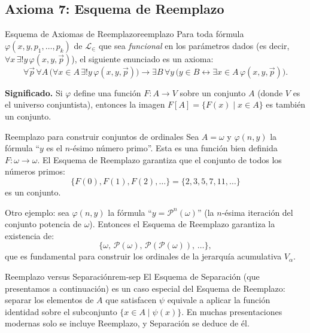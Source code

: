 \subsection{Axioma 7: Esquema de Reemplazo}

\begin{definicion}{Esquema de Axiomas de Reemplazo}{reemplazo}
Para toda fórmula $\varphi(x, y, p_1, \ldots, p_k)$ de $\mathcal{L}_{\in}$ que sea \emph{funcional} en los parámetros dados (es decir, $\forall x\,\exists! y\,\varphi(x,y,\vec{p})$), el siguiente enunciado es un axioma:
\[
  \forall \vec{p}\,\forall A\,\bigl(\forall x \in A\,\exists! y\,\varphi(x,y,\vec{p})\bigr)
  \to \exists B\,\forall y\,\bigl(y \in B \leftrightarrow \exists x \in A\,\varphi(x,y,\vec{p})\bigr).
\]
\end{definicion}

\textbf{Significado.} Si $\varphi$ define una función $F: A \to V$ sobre un conjunto $A$ (donde $V$ es el universo conjuntista), entonces la imagen $F[A] = \{F(x) \mid x \in A\}$ es también un conjunto.

\begin{ejemplo}{Reemplazo para construir conjuntos de ordinales}{}
Sea $A = \omega$ y $\varphi(n, y)$ la fórmula ``$y$ es el $n$-ésimo número primo''. Esta es una función bien definida $F: \omega \to \omega$. El Esquema de Reemplazo garantiza que el conjunto de todos los números primos:
\[
  \{F(0), F(1), F(2), \ldots\} = \{2, 3, 5, 7, 11, \ldots\}
\]
es un conjunto.

Otro ejemplo: sea $\varphi(n, y)$ la fórmula ``$y = \mathcal{P}^n(\omega)$'' (la $n$-ésima iteración del conjunto potencia de $\omega$). Entonces el Esquema de Reemplazo garantiza la existencia de:
\[
  \{\omega,\, \mathcal{P}(\omega),\, \mathcal{P}(\mathcal{P}(\omega)),\, \ldots\},
\]
que es fundamental para construir los ordinales de la jerarquía acumulativa $V_\alpha$.
\end{ejemplo}

\begin{observacion}{Reemplazo versus Separación}{rem-sep}
El Esquema de Separación (que presentamos a continuación) es un caso especial del Esquema de Reemplazo: separar los elementos de $A$ que satisfacen $\psi$ equivale a aplicar la función identidad sobre el subconjunto $\{x \in A \mid \psi(x)\}$. En muchas presentaciones modernas solo se incluye Reemplazo, y Separación se deduce de él.
\end{observacion}

